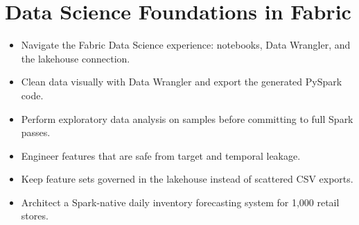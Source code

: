 \chapter{Data Science Foundations in Fabric}
%

\begin{objectives}
\begin{itemize}
    \item Navigate the Fabric Data Science experience: notebooks, Data Wrangler, and the lakehouse connection.
    \item Clean data visually with Data Wrangler and export the generated PySpark code.
    \item Perform exploratory data analysis on samples before committing to full Spark passes.
    \item Engineer features that are safe from target and temporal leakage.
    \item Keep feature sets governed in the lakehouse instead of scattered CSV exports.
    \item Architect a Spark-native daily inventory forecasting system for 1,000 retail stores.
\end{itemize}
\end{objectives}

